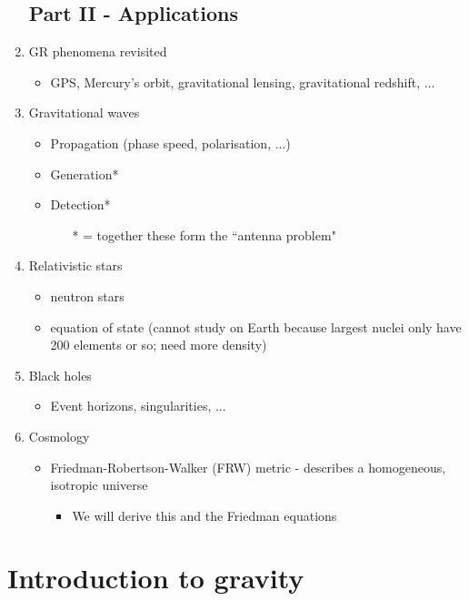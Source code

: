 \documentclass[a4paper]{article} %
\begin{document}
\begin{enumerate}
\subsection{Part II - Applications}
\item GR phenomena revisited 
\begin{itemize}
\item GPS, Mercury's orbit, gravitational lensing, gravitational redshift, ...
\end{itemize}
\item Gravitational waves
\begin{itemize}
\item Propagation (phase speed, polarisation, ...)
\item Generation*
\item Detection*
\begin{itemize}
\item[*] = together these form the ``antenna problem"
\end{itemize}
\end{itemize}
\item Relativistic stars
\begin{itemize}
\item neutron stars
\item equation of state (cannot study on Earth because largest nuclei only have 200 elements or so; need more density)
\end{itemize}
\item Black holes
\begin{itemize}
\item Event horizons, singularities, ...
\end{itemize}
\item Cosmology
\begin{itemize}
\item Friedman-Robertson-Walker (FRW) metric - describes a homogeneous, isotropic universe
\begin{itemize}
\item We will derive this and the Friedman equations
\end{itemize}
\end{itemize}

\end{enumerate}


\section{Introduction to gravity}
\end{document}
